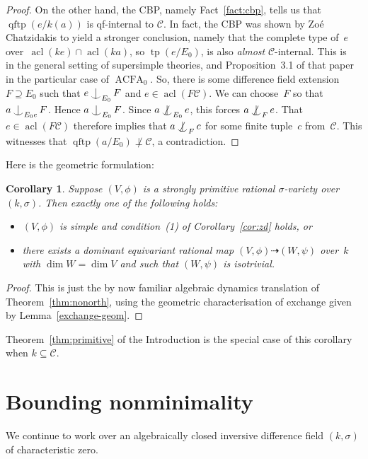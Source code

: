 \documentclass[\DocOpts]{amsart}
\newtheorem{corollary}[theorem]{Corollary}
\theoremstyle{definition}
\def\acfa{\operatorname{ACFA}}
\def\tp{\operatorname{tp}}
\def\qftp{\operatorname{qftp}}
\def\acl{\operatorname{acl}}
\def\C{\mathcal{C}}
\newcommand{\<}{\langle}
\renewcommand{\>}{\rangle}
\newcommand{\dto}{\dashrightarrow}
\def\Ind#1#2{#1\setbox0=\hbox{\(#1x\)}\kern\wd0\hbox to 
0pt{\hss\(#1\mid\)\hss}\lower.9\ht0\hbox to 
0pt{\hss\(#1\smile\)\hss}\kern\wd0}
\def\ind{\mathop{\mathpalette\Ind{}}}
\def\notind#1#2{#1\setbox0=\hbox{\(#1x\)}\kern\wd0\hbox to 
0pt{\mathchardef\nn=12854\hss\(#1\nn\)\kern1.4\wd0\hss}\hbox to 
0pt{\hss\(#1\mid\)\hss}\lower.9\ht0 \hbox to 
0pt{\hss\(#1\smile\)\hss}\kern\wd0}
\def\nind{\mathop{\mathpalette\notind{}}}
\begin{document}
\begin{proof}
On the other hand, the CBP, namely Fact~\ref{fact:cbp}, tells us that $\qftp(e/k(a))$ is qf-internal to $\C$.
In fact, the CBP was shown by Zo\'e Chatzidakis to yield a stronger conclusion, namely that the complete type of~$e$ over~$\acl(ke)\cap\acl(ka)$, so $\tp(e/E_0)$, is also {\em almost} $\C$-internal.
This is~\cite[Theorem~2.1]{zoe-cbp} in the general setting of supersimple theories, and Proposition~3.1 of that paper in the particular case of $\acfa_0$.
So, there is some difference field extension $F\supseteq E_0$ such that 
$e\ind_{E_0}F$ and $e\in\acl(F\C)$.
We can choose~$F$ so that $a\ind_{E_0e}F$.
Hence $a\ind_{E_0}F$.
Since $a\nind_{E_0}e$, this forces $a\nind_Fe$.
That $e\in\acl(F\C)$ therefore implies that $a\nind_F c$ for some finite tuple~$c$ from~$\C$.
This witnesses that $\qftp(a/E_0)\not\perp\C$, a contradiction.
\end{proof}



Here is the geometric formulation:

\begin{corollary}
\label{cor:zdexchange}
Suppose $(V,\phi)$ is a strongly primitive rational $\sigma$-variety over $(k,\sigma)$.
Then exactly one of the following holds:
\begin{itemize}
\item[(1)]
$(V,\phi)$ is simple and condition~(1) of Corollary~\ref{cor:zd} holds, or 
\item[(2)]
there exists a dominant equivariant rational map $(V,\phi)\dto(W,\psi)$ over~$k$ with $\dim W=\dim V$ and such that $(W,\psi)$ is isotrivial.
\end{itemize}
\end{corollary}

\begin{proof}
This is just the by now familiar algebraic dynamics translation of Theorem~\ref{thm:nonorth}, using the geometric characterisation of exchange given by Lemma~\ref{exchange-geom}.
\end{proof}

Theorem~\ref{thm:primitive} of the Introduction is the special case of this corollary when $k\subseteq\C$.

\bigskip
\section{Bounding nonminimality}
\label{sec:nmdeg}

\noindent
We continue to work over an algebraically closed inversive difference field $(k,\sigma)$ of characteristic zero.
\end{document}
